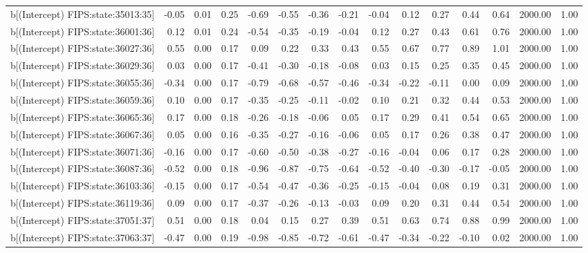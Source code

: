 \begin{table}[ht]
\begin{tabular}{rrrrrrrrrrrrrrr}
  b[(Intercept) FIPS:state:35013:35] & -0.05 & 0.01 & 0.25 & -0.69 & -0.55 & -0.36 & -0.21 & -0.04 & 0.12 & 0.27 & 0.44 & 0.64 & 2000.00 & 1.00 \\ 
  b[(Intercept) FIPS:state:36001:36] & 0.12 & 0.01 & 0.24 & -0.54 & -0.35 & -0.19 & -0.04 & 0.12 & 0.27 & 0.43 & 0.61 & 0.76 & 2000.00 & 1.00 \\ 
  b[(Intercept) FIPS:state:36027:36] & 0.55 & 0.00 & 0.17 & 0.09 & 0.22 & 0.33 & 0.43 & 0.55 & 0.67 & 0.77 & 0.89 & 1.01 & 2000.00 & 1.00 \\ 
  b[(Intercept) FIPS:state:36029:36] & 0.03 & 0.00 & 0.17 & -0.41 & -0.30 & -0.18 & -0.08 & 0.03 & 0.15 & 0.25 & 0.35 & 0.45 & 2000.00 & 1.00 \\ 
  b[(Intercept) FIPS:state:36055:36] & -0.34 & 0.00 & 0.17 & -0.79 & -0.68 & -0.57 & -0.46 & -0.34 & -0.22 & -0.11 & 0.00 & 0.09 & 2000.00 & 1.00 \\ 
  b[(Intercept) FIPS:state:36059:36] & 0.10 & 0.00 & 0.17 & -0.35 & -0.25 & -0.11 & -0.02 & 0.10 & 0.21 & 0.32 & 0.44 & 0.53 & 2000.00 & 1.00 \\ 
  b[(Intercept) FIPS:state:36065:36] & 0.17 & 0.00 & 0.18 & -0.26 & -0.18 & -0.06 & 0.05 & 0.17 & 0.29 & 0.41 & 0.54 & 0.65 & 2000.00 & 1.00 \\ 
  b[(Intercept) FIPS:state:36067:36] & 0.05 & 0.00 & 0.16 & -0.35 & -0.27 & -0.16 & -0.06 & 0.05 & 0.17 & 0.26 & 0.38 & 0.47 & 2000.00 & 1.00 \\ 
  b[(Intercept) FIPS:state:36071:36] & -0.16 & 0.00 & 0.17 & -0.60 & -0.50 & -0.38 & -0.27 & -0.16 & -0.04 & 0.06 & 0.17 & 0.28 & 2000.00 & 1.00 \\ 
  b[(Intercept) FIPS:state:36087:36] & -0.52 & 0.00 & 0.18 & -0.96 & -0.87 & -0.75 & -0.64 & -0.52 & -0.40 & -0.30 & -0.17 & -0.05 & 2000.00 & 1.00 \\ 
  b[(Intercept) FIPS:state:36103:36] & -0.15 & 0.00 & 0.17 & -0.54 & -0.47 & -0.36 & -0.25 & -0.15 & -0.04 & 0.08 & 0.19 & 0.31 & 2000.00 & 1.00 \\ 
  b[(Intercept) FIPS:state:36119:36] & 0.09 & 0.00 & 0.17 & -0.37 & -0.26 & -0.13 & -0.03 & 0.09 & 0.20 & 0.31 & 0.44 & 0.54 & 2000.00 & 1.00 \\ 
  b[(Intercept) FIPS:state:37051:37] & 0.51 & 0.00 & 0.18 & 0.04 & 0.15 & 0.27 & 0.39 & 0.51 & 0.63 & 0.74 & 0.88 & 0.99 & 2000.00 & 1.00 \\ 
  b[(Intercept) FIPS:state:37063:37] & -0.47 & 0.00 & 0.19 & -0.98 & -0.85 & -0.72 & -0.61 & -0.47 & -0.34 & -0.22 & -0.10 & 0.02 & 2000.00 & 1.00 \\ 

\end{tabular}
\end{table}
